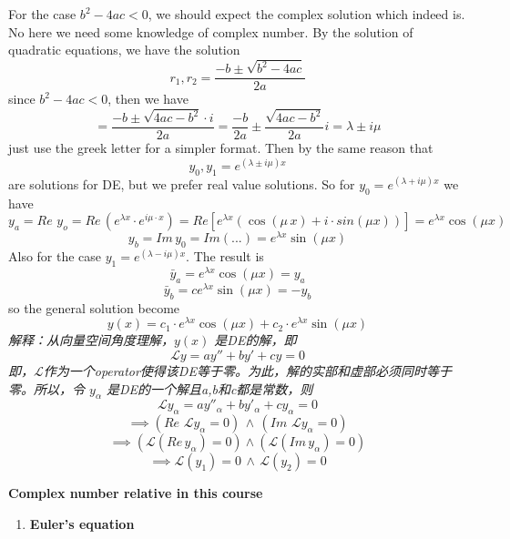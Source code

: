 \documentclass[9pt]{article}
\theoremstyle{definition}
\newenvironment{changemargin}[2]{%
  \begin{list}{}{%
    \setlength{\topsep}{0pt}%
    \setlength{\leftmargin}{#1}%
    \setlength{\rightmargin}{#2}%
    \setlength{\listparindent}{\parindent}%
    \setlength{\itemindent}{\parindent}%
    \setlength{\parsep}{\parskip}%
  }%
  \item[]}{\end{list}}
\theoremstyle{theorem}
\theoremstyle{remark}
\theoremstyle{lemma}
\begin{document}
\begin{changemargin}{-0.125in}{0in}
\begin{enumerate}
\begin{enumerate}
     For the case $b^2 - 4ac < 0$, we should expect the complex solution which indeed is. No here we need some knowledge of complex number. By the solution of quadratic equations, we have the solution 
     \[
     r_1,r_2 = \frac{-b \pm \sqrt{b^2 - 4ac}}{2a}
     \]
     since $b^2 - 4ac < 0$, then we have
     \[
      = \frac{-b \pm \sqrt{4ac - b^2} \cdot i}{2a} = \frac{-b}{2a} \pm \frac{\sqrt{4ac - b^2}}{2a}i = \lambda \pm i\mu
     \]
     just use the greek letter for a simpler format. Then by the same reason that 
     \[
     y_0,y_1 = e^{(\lambda \pm i\mu) x}
     \]
     are solutions for DE, but we prefer real value solutions. So for $y_0 = e^{(\lambda + i\mu)x}$ we have 
     \[
     y_a = Re\,\, y_o = Re \, (e^{\lambda x} \cdot e^{i\mu \cdot x}) = Re[e^{\lambda x} (\cos (\mu \, x)+ i \cdot sin(\mu x))] = e^{\lambda x}\cos (\mu x)
     \]
     \[
          y_b = Im \, y_0  = Im(...)  = e^{\lambda x} \sin (\mu x)
     \]
     Also for the case $y_1 = e^{(\lambda - i\mu)x}$. The result is 
     \[
          \bar{y}_a = e^{\lambda x} \cos (\mu x) = y_a
     \]
     \[
          \bar{y}_b =  ce^{\lambda x} \sin (\mu x) = - y_b
     \]
     so the general solution become
     \[
     y(x) = c_1 \cdot  e^{\lambda x} \cos (\mu x) + c_2 \cdot e^{\lambda x} \sin (\mu x)
     \]
     \textit{解释：从向量空间角度理解，$y(x)$ 是DE的解，即}
     \[
     \mathcal{L} y = ay'' + b y' + c y = 0
     \]
     \textit{即，$\mathcal{L}$作为一个operator使得该DE等于零。为此，解的实部和虚部必须同时等于零。所以，令 $y_\alpha$ 是DE的一个解且a,b和c都是常数，则}
     \[
     \mathcal{L} y_\alpha = ay''_\alpha+ by'_\alpha + cy_\alpha = 0
     \]
     \[
     \implies (Re \,\,\mathcal{L}y_\alpha = 0)\, \wedge \,(Im \,\,\mathcal{L}y_\alpha = 0)
     \]
     \[
     \implies (\mathcal{L}(Re \,y_\alpha) = 0) \wedge (\mathcal{L}(Im \,y_\alpha) = 0)
     \]
     \[
     \implies \mathcal{L}(y_1) = 0 \,\wedge \,\mathcal{L}(y_2) = 0
     \]
      \end{enumerate}
      
      
      
      \medskip
      
      \medskip
      
      
      \textbf{Complex number relative in this course}
      
      \begin{enumerate}
      
      \item \textbf{Euler's equation}
      
      \medskip
      

\end{enumerate}
\end{enumerate}
\end{changemargin}
\end{document}
